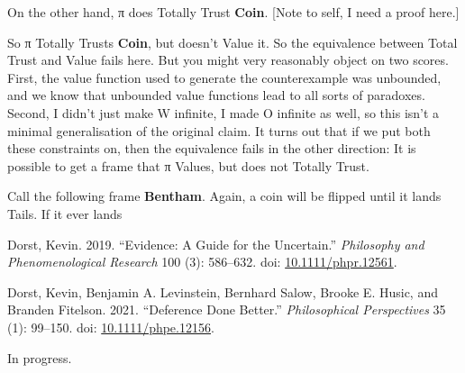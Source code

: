 \documentclass[
  11pt,
  letterpaper,
  DIV=11,
  numbers=noendperiod,
  twoside]{scrartcl}
\newlength{\cslhangindent}
\newenvironment{CSLReferences}[2] %
 {\begin{list}{}{%
  \setlength{\itemindent}{0pt}
  \setlength{\leftmargin}{0pt}
  \setlength{\parsep}{0pt}
  \ifodd #1
   \setlength{\leftmargin}{\cslhangindent}
   \setlength{\itemindent}{-1\cslhangindent}
  \fi
  \setlength{\itemsep}{#2\baselineskip}}}
 {\end{list}}
\begin{document}
On the other hand, π does Totally Trust \textbf{Coin}. {[}Note to self,
I need a proof here.{]}

So π Totally Trusts \textbf{Coin}, but doesn't Value it. So the
equivalence between Total Trust and Value fails here. But you might very
reasonably object on two scores. First, the value function used to
generate the counterexample was unbounded, and we know that unbounded
value functions lead to all sorts of paradoxes. Second, I didn't just
make W infinite, I made O infinite as well, so this isn't a minimal
generalisation of the original claim. It turns out that if we put both
these constraints on, then the equivalence fails in the other direction:
It is possible to get a frame that π Values, but does not Totally Trust.

Call the following frame \textbf{Bentham}. Again, a coin will be flipped
until it lands Tails. If it ever lands

\label{refs}
\begin{CSLReferences}{1}{0}
Dorst, Kevin. 2019. {``Evidence: A Guide for the Uncertain.''}
\emph{Philosophy and Phenomenological Research} 100 (3): 586--632. doi:
\href{https://doi.org/10.1111/phpr.12561}{10.1111/phpr.12561}.

Dorst, Kevin, Benjamin A. Levinstein, Bernhard Salow, Brooke E. Husic,
and Branden Fitelson. 2021. {``Deference Done Better.''}
\emph{Philosophical Perspectives} 35 (1): 99--150. doi:
\href{https://doi.org/10.1111/phpe.12156}{10.1111/phpe.12156}.

\end{CSLReferences}



\noindent \vspace{1in} In progress.
\end{document}
